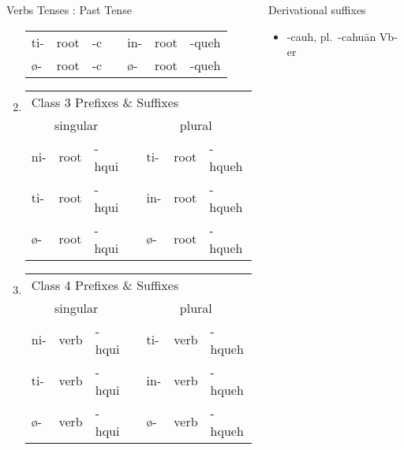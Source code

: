 \documentclass[12pt]{beamer}
\newcommand{\nah}[1]{\textcolor{nahgrn}{#1}}
\newcommand{\trs}[1]{\textcolor{nahblu}{#1}}
\begin{document}
\begin{frame}
\begin{columns}[t]
\begin{column}{.26\linewidth}
\begin{block}{Verbs Tenses : Past Tense}
\begin{enumerate}
\begin{tabular}[t]{lllllll}
      			\nah{ti-}   & root & \trs{-c}   & \vline & \nah{in-}   & root & \trs{-queh}  \\
      			\nah{ø-}    & root & \trs{-c}   & \vline & \nah{ø-}    & root & \trs{-queh}  \\
      		\end{tabular}%
      		\item \begin{tabular}[t]{lllllll}
      			\multicolumn{7}{l}{Class 3 \nah{Prefixes} \& \trs{Suffixes}}       	         \\
      			\multicolumn{3}{c}{singular}    & \vline & \multicolumn{3}{c}{plural}        \\
      			\cline{1-7}
      			\nah{ni-}   & root & \trs{-hqui}   & \vline & \nah{ti-}   & root & \trs{-hqueh}  \\
      			\nah{ti-}   & root & \trs{-hqui}   & \vline & \nah{in-}   & root & \trs{-hqueh}  \\
      			\nah{ø-}    & root & \trs{-hqui}   & \vline & \nah{ø-}    & root & \trs{-hqueh}  \\
      		\end{tabular}%
      		\item \begin{tabular}[t]{lllllll}
      			\multicolumn{7}{l}{Class 4 \nah{Prefixes} \& \trs{Suffixes}}       	         \\
      			\multicolumn{3}{c}{singular}    & \vline & \multicolumn{3}{c}{plural}        \\
      			\cline{1-7}
      			\nah{ni-}   & verb & \trs{-hqui}   & \vline & \nah{ti-}   & verb & \trs{-hqueh}  \\
      			\nah{ti-}   & verb & \trs{-hqui}   & \vline & \nah{in-}   & verb & \trs{-hqueh}  \\
      			\nah{ø-}    & verb & \trs{-hqui}   & \vline & \nah{ø-}    & verb & \trs{-hqueh}  \\
      		\end{tabular}%
      	\end{enumerate}
      \end{block}
    \end{column}
    \begin{column}{.20\linewidth}
      \begin{block}{Derivational suffixes}
      	\begin{threeparttable}
      		\begin{itemize}
      			\item \nah{-cauh}, pl.~\nah{-cahuān}  \trs{Vb-er}

\end{itemize}
\end{threeparttable}
\end{block}
\end{column}
\end{columns}
\end{frame}
\end{document}
